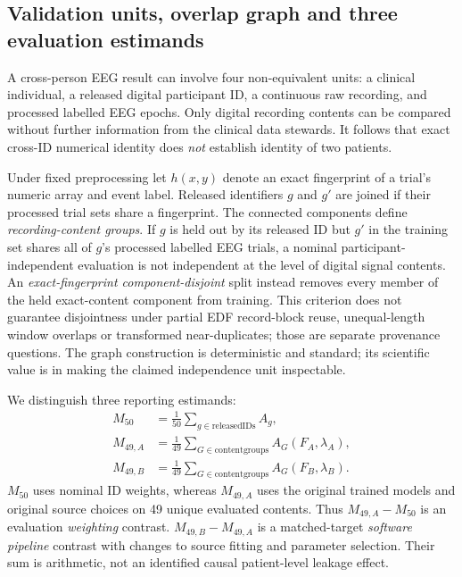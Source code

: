 \subsection{Validation units, overlap graph and three evaluation estimands}
\label{sec:p2-units}
A cross-person EEG result can involve four non-equivalent units:
a clinical individual, a released digital participant ID,
a continuous raw recording, and processed labelled EEG
epochs. Only digital recording contents can be compared
without further information from the clinical data stewards.
It follows that exact cross-ID numerical identity does
\emph{not} establish identity of two patients.

Under fixed preprocessing let $h(x,y)$ denote an exact
fingerprint of a trial's numeric array and event label.
Released identifiers $g$ and $g'$ are joined if their
processed trial sets share a fingerprint. The connected
components define \emph{recording-content groups}.
If $g$ is held out by its released ID but $g'$ in the
training set shares all of $g$'s processed labelled EEG
trials, a nominal participant-independent evaluation
is not independent at the level of digital signal
contents. An \emph{exact-fingerprint component-disjoint}
split instead removes every member of the held
exact-content component from training. This
criterion does not guarantee disjointness under
partial EDF record-block reuse, unequal-length
window overlaps or transformed near-duplicates;
those are separate provenance questions. The graph construction is deterministic and
standard; its scientific value is in making the
claimed independence unit inspectable.

We distinguish three reporting estimands:
\[
\begin{split}
 M_{50}&=\frac{1}{50}\sum_{g\in\mathrm{released IDs}}A_g,
 \\
 M_{49,A}&=\frac{1}{49}\sum_{G\in\mathrm{content groups}}
                  A_G(F_A,\lambda_A),\\
 M_{49,B}&=\frac{1}{49}\sum_{G\in\mathrm{content groups}}
                  A_G(F_B,\lambda_B).
\end{split}
\]
$M_{50}$ uses nominal ID weights, whereas $M_{49,A}$
uses the original trained models and original source
choices on 49 unique evaluated contents. Thus
$M_{49,A}-M_{50}$ is an evaluation \emph{weighting}
contrast. $M_{49,B}-M_{49,A}$ is a matched-target
\emph{software pipeline} contrast with changes to
source fitting and parameter selection.
Their sum is arithmetic, not an identified
causal patient-level leakage effect.

